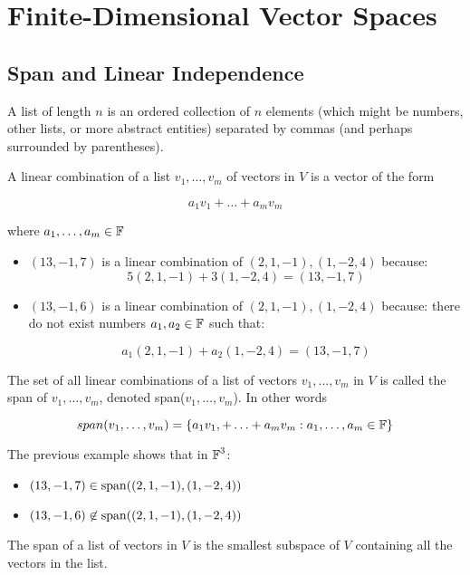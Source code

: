 
\section{Finite-Dimensional Vector Spaces}

\subsection{Span and Linear Independence}

\begin{definition}
    A list of length $n$ is an ordered collection of $n$ elements (which might be
    numbers, other lists, or more abstract entities) separated by commas (and perhaps surrounded
    by parentheses).
    \end{definition}

\begin{definition}
    A linear combination of a list $v_1, \ldots, v_m$ of vectors in $V$ is a vector
    of the form

    \[ a_1 v_1 + \ldots + a_m v_m \]

    where $a_1, \ldots, a_m \in \operatorname{\mathbb{F}}$
\end{definition}

\begin{itemize}
    \item $(13, -1, 7)$ is a linear combination of $(2, 1, -1), (1, -2, 4)$ because:
    \[ 5(2, 1, -1) + 3(1, -2, 4) = (13, -1, 7) \]

    \item $(13, -1, 6)$ is a linear combination of $(2, 1, -1), (1, -2, 4)$ because:
    there do not exist numbers $a_1, a_2 \in \operatorname{\mathbb{F}}$ such that:
    
    \[ a_1(2, 1, -1) + a_2(1, -2, 4) = (13, -1, 7) \]
\end{itemize}

\begin{definition}
    The set of all linear combinations of a list of vectors $v_1, \ldots, v_m$ in $V$
    is called the span of $v_1, \ldots, v_m$, denoted span($v_1, \ldots, v_m$). In other words

    \[ span(v_1, \ldots, v_m) = \{ a_1 v_1, + \ldots + a_m v_m : a_1, \ldots, a_m \in \operatorname{\mathbb{F}} \} \]
\end{definition}

The previous example shows that in $\operatorname{\mathbb{F}}^3$:

\begin{itemize}
    \item $(13, -1, 7) \in \operatorname{span}((2, 1, -1), (1, -2, 4))$
    \item $(13, -1, 6) \not \in \operatorname{span}((2, 1, -1), (1, -2, 4))$
\end{itemize}
\begin{definition}
    The span of a list of vectors in $V$ is the smallest subspace of $V$
    containing all the vectors in the list.
\end{definition}

